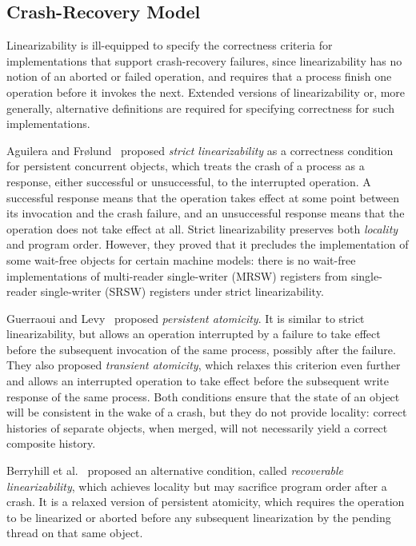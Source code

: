 \subsection{Crash-Recovery Model}
\label{subsec:progressCorrectness}

Linearizability is ill-equipped to specify the correctness criteria for
implementations that support crash-recovery failures,
since linearizability has no notion of an aborted or failed operation,
and requires that a process finish one operation before it invokes the next.
Extended versions of linearizability or, more generally,
alternative definitions are required for
specifying correctness for such implementations.

Aguilera and Fr{\o}lund~\cite{Aguilera2003StrictLA}
proposed \emph{strict linearizability} as a correctness condition
for persistent concurrent objects,
which treats the crash of a process as a response,
either successful or unsuccessful, to the interrupted operation.
A successful response means that the operation takes effect at some point
between its invocation and the crash failure,
and an unsuccessful response means that the operation does not take effect at all.
Strict linearizability preserves both \emph{locality}~\cite{herlihy91waitfree}
and program order.
However, they proved that it precludes the implementation of
some wait-free objects for certain machine models:
there is no wait-free implementations of multi-reader single-writer (MRSW)
registers from single-reader single-writer (SRSW) registers under strict linearizability.

Guerraoui and Levy~\cite{DBLP:conf/icdcs/GuerraouiL04}
proposed \emph{persistent atomicity}.
It is similar to strict linearizability, but allows an operation
interrupted by a failure to take effect before
the subsequent invocation of the same process, possibly after the failure.
They also proposed \emph{transient atomicity},
which relaxes this criterion even further and allows an interrupted operation
to take effect before the subsequent write response of the same process.
Both conditions ensure that the state of an object will be consistent
in the wake of a crash, but they do not provide locality:
correct histories of separate objects, when merged,
will not necessarily yield a correct composite history.

Berryhill et al.~\cite{DBLP:conf/opodis/BerryhillGT15} proposed an alternative
condition, called \emph{recoverable linearizability},
which achieves locality but may sacrifice program order after a crash.
It is a relaxed version of persistent atomicity,
which requires the operation to be linearized or aborted before
any subsequent linearization by the pending thread on that same object.

